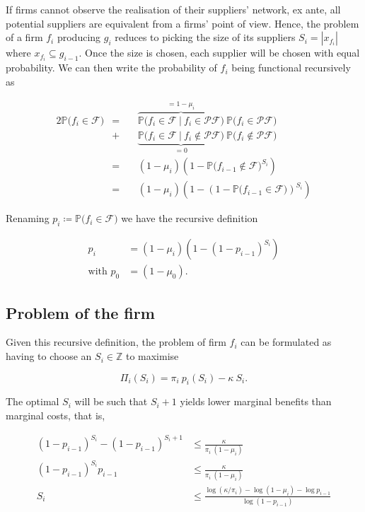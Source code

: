 \documentclass[american, abstract=on]{scrartcl}
\newcommand{\F}{\mathcal{F}}
\newcommand{\PF}{\mathcal{P} \F}
\renewcommand{\P}{\mathbb{P}}
\newcommand{\abs}[1]{\left\lvert#1\right\rvert}
\begin{document}
If firms cannot observe the realisation of their suppliers' network, ex ante, all potential suppliers are equivalent from a firms' point of view. Hence, the problem of a firm $f_i$ producing $g_i$ reduces to picking the size of its suppliers $S_i = \abs{x_{f_i}}$ where $x_{f_i} \subseteq g_{i - 1}$. Once the size is chosen, each supplier will be chosen with equal probability. We can then write the probability of $f_i$ being functional recursively as

\begin{alignat*}{2}
  \P\Big( f_i \in \F \Big) &= \ &&\overbrace{\P\Big( f_i \in \F \ \vert \ f_i \in \PF \Big)}^{= 1 - \mu_i} \ \P\Big( f_i \in \PF \Big) \\
  &+ &&\underbrace{\P\Big( f_i \in \F \ \vert \ f_i \notin \PF \Big)}_{= 0} \  \P\Big( f_i \notin \PF \Big) \\
  &= &&(1 - \mu_i) \left( 1 - \P\Big( f_{i-1} \notin \F \Big)^{S_i} \right) \\
  &= &&(1 - \mu_i) \left( 1 - \left(1 - \P\Big( f_{i-1} \in \F \Big)\right)^{S_i} \right)
\end{alignat*}

Renaming $p_i \coloneqq \P\Big( f_i \in \F \Big)$ we have the recursive definition

\begin{equation}
  \begin{split}
    p_{i} &= (1 - \mu_i) \left( 1 - (1 - p_{i-1})^{S_i} \right) \\
    \text{with } p_0 &= (1 - \mu_0).
  \end{split}
\end{equation}


\subsection{Problem of the firm}

Given this recursive definition, the problem of firm $f_i$ can be formulated as having to choose an $S_i \in \mathbb{Z}$ to maximise

\begin{equation}
  \Pi_i(S_i) = \pi_i \ p_i(S_i) - \kappa \ S_i.
\end{equation}

The optimal $S_i$ will be such that $S_i + 1$ yields lower marginal benefits than marginal costs, that is,

\begin{equation}
  \begin{split}
    (1 - p_{i-1})^{S_i} - (1 - p_{i-1})^{S_i + 1} &\leq \frac{\kappa}{\pi_i \ (1 - \mu_i)} \\
    (1 - p_{i-1})^{S_i} p_{i - 1} &\leq \frac{\kappa}{\pi_i \ (1 - \mu_i)} \\
    S_i&\leq \frac{\log\left( \kappa / \pi_i \right) - \log(1 - \mu_i) - \log p_{i - 1}}{\log(1 - p_{i-1})}
  \end{split}
\end{equation}
\end{document}
